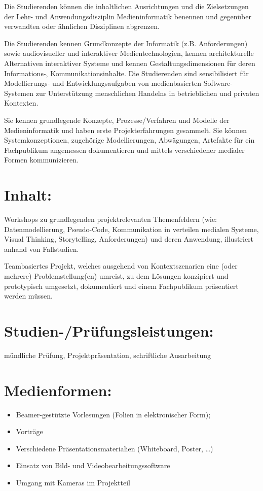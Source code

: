 Die Studierenden können die inhaltlichen Ausrichtungen und die
Zielsetzungen der Lehr- und Anwendungsdisziplin Medieninformatik
benennen und gegenüber verwandten oder ähnlichen Disziplinen abgrenzen.

Die Studierenden kennen Grundkonzepte der Informatik (z.B.
Anforderungen) sowie audiovisueller und interaktiver Medientechnologien,
kennen architekturelle Alternativen interaktiver Systeme und kennen
Gestaltungsdimensionen für deren Informations-, Kommunikationsinhalte.
Die Studierenden sind sensibilisiert für Modellierungs- und
Entwicklungsaufgaben von medienbasierten Software-Systemen zur
Unterstützung menschlichen Handelns in betrieblichen und privaten
Kontexten.

Sie kennen grundlegende Konzepte, Prozesse/Verfahren und Modelle der
Medieninformatik und haben erste Projekterfahrungen gesammelt. Sie
können Systemkonzeptionen, zugehörige Modellierungen, Abwägungen,
Artefakte für ein Fachpublikum angemessen dokumentieren und mittels
verschiedener medialer Formen kommunizieren.

\section{Inhalt:}\label{inhalt-9}

Workshops zu grundlegenden projektrelevanten Themenfeldern (wie:
Datenmodellierung, Pseudo-Code, Kommunikation in verteilen medialen
Systeme, Visual Thinking, Storytelling, Anforderungen) und deren
Anwendung, illustriert anhand von Fallstudien.

Teambasiertes Projekt, welches ausgehend von Kontextszenarien eine (oder
mehrere) Problemstellung(en) umreist, zu dem Lösungen konzipiert und
prototypisch umgesetzt, dokumentiert und einem Fachpublikum präsentiert
werden müssen.

\section{Studien-/Prüfungsleistungen:}\label{studien-pruxfcfungsleistungen-9}

mündliche Prüfung, Projektpräsentation, schriftliche Ausarbeitung

\section{Medienformen:}\label{medienformen-9}

\begin{itemize}
\tightlist
\item
  Beamer-gestützte Vorlesungen (Folien in elektronischer Form);
\item
  Vorträge
\item
  Verschiedene Präsentationsmaterialien (Whiteboard, Poster, \ldots{})
\item
  Einsatz von Bild- und Videobearbeitungssoftware
\item
  Umgang mit Kameras im Projektteil
\end{itemize}


